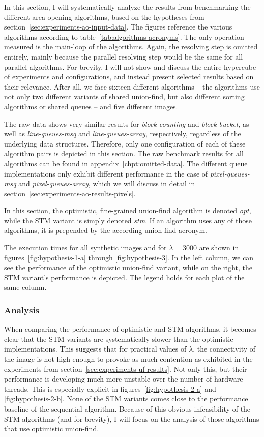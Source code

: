 In this section, I will systematically analyze the results from benchmarking the
different area opening algorithms, based on the hypotheses from
section~\ref{sec:experiments-ao-input-data}. The figures reference the various
algorithms according to table~\ref{tab:algorithms-acronyms}. The only operation
measured is the main-loop of the algorithms. Again, the resolving step is
omitted entirely, mainly because the parallel resolving step would be the same
for all parallel algorithms. For brevity, I will not show and discuss the entire
hypercube of experiments and configurations, and instead present selected
results based on their relevance. After all, we face sixteen different
algorithms -- the algorithms use not only two different variants of shared
union-find, but also different sorting algorithms or shared queues -- and five
different images.

The raw data shows very similar results for \emph{block-counting} and
\emph{block-bucket}, as well as \emph{line-queues-msq} and
\emph{line-queues-array}, respectively, regardless of the underlying data
structures. Therefore, only one configuration of each of these algorithm pairs
is depicted in this section. The raw benchmark results for all algorithms can be
found in appendix~\ref{chpt:omitted-data}. The different queue implementations
only exhibit different performance in the case of \emph{pixel-queues-msq} and
\emph{pixel-queues-array}, which we will discuss in detail in
section~\ref{sec:experiments-ao-results-pixels}.

In this section, the optimistic, fine-grained union-find algorithm is denoted
\emph{opt}, while the STM variant is simply denoted \emph{stm}. If an algorithm
uses any of those algorithms, it is prepended by the according union-find
acronym.

The execution times for all synthetic images and for $\lambda = 3000$ are
shown in figures~\ref{fig:hypothesis-1-a} through \ref{fig:hypothesis-3}. In the
left column, we can see the performance of the optimistic union-find variant,
while on the right, the STM variant's performance is depicted. The legend holds
for each plot of the same column.

\subsubsection{Analysis}

When comparing the performance of optimistic and STM algorithms, it becomes
clear that the STM variants are systematically slower than the optimistic
implementations. This suggests that for practical values of $\lambda$, the
connectivity of the image is not high enough to provoke as much contention as
exhibited in the experiments from section~\ref{sec:experiments-uf-results}. Not
only this, but their performance is developing much more unstable over the
number of hardware threads. This is especially explicit in
figures~\ref{fig:hypothesis-2-a} and \ref{fig:hypothesis-2-b}. None of the STM
variants comes close to the performance baseline of the sequential
algorithm. Because of this obvious infeasibility of the STM algorithms (and for
brevity), I will focus on the analysis of those algorithms that use optimistic
union-find.

